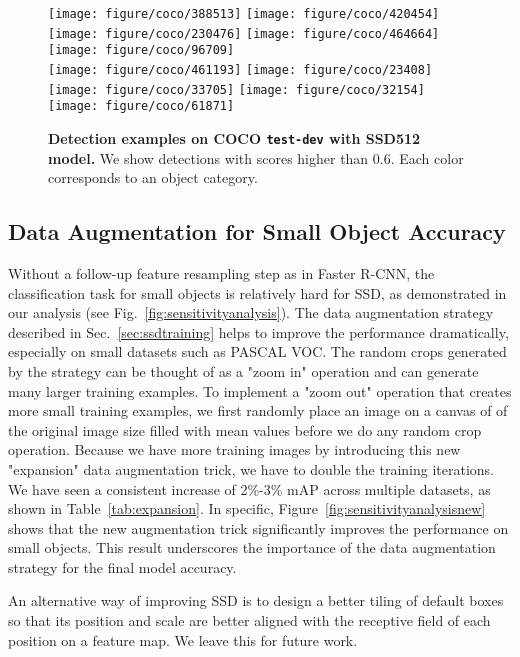 \documentclass[runningheads]{llncs}
\begin{document}
\begin{figure}
	\texttt{[image: figure/coco/388513]}
	\texttt{[image: figure/coco/420454]}
	\texttt{[image: figure/coco/230476]}
	\texttt{[image: figure/coco/464664]}
	\texttt{[image: figure/coco/96709]}\\
	\texttt{[image: figure/coco/461193]}
	\texttt{[image: figure/coco/23408]}
	\texttt{[image: figure/coco/33705]}
	\texttt{[image: figure/coco/32154]}
	\texttt{[image: figure/coco/61871]}\\
	\caption{\textbf{Detection examples on COCO \texttt{test-dev} with SSD512 model.} We show detections with scores higher than 0.6. Each color corresponds to an object category.}
    \label{fig:coco}
\end{figure}

\subsection{Data Augmentation for Small Object Accuracy}
\label{sec:data-aug-new}
Without a follow-up feature resampling step as in Faster R-CNN, the classification task for small objects is relatively hard for SSD, as demonstrated in our analysis (see Fig.~\ref{fig:sensitivityanalysis}).
The data augmentation strategy described in Sec.~\ref{sec:ssdtraining} helps to improve the performance dramatically, especially on small datasets such as PASCAL VOC. The random crops generated by the strategy can be thought of as a "zoom in" operation and can generate many larger training examples. To implement a "zoom out" operation that creates more small training examples, we first randomly place an image on a canvas of  of the original image size filled with mean values before we do any random crop operation. Because we have more training images by introducing this new "expansion" data augmentation trick, we have to double the training iterations. We have seen a consistent increase of 2\%-3\% mAP across multiple datasets, as shown in Table~\ref{tab:expansion}. In specific, Figure~\ref{fig:sensitivityanalysisnew} shows that the new augmentation trick significantly improves the performance on small objects. This result underscores the importance of the data augmentation strategy for the final model accuracy. 

An alternative way of improving SSD is to design a better tiling of default boxes so that its position and scale are better aligned with the receptive field of each position on a feature map. We leave this for future work. 
\end{document}
